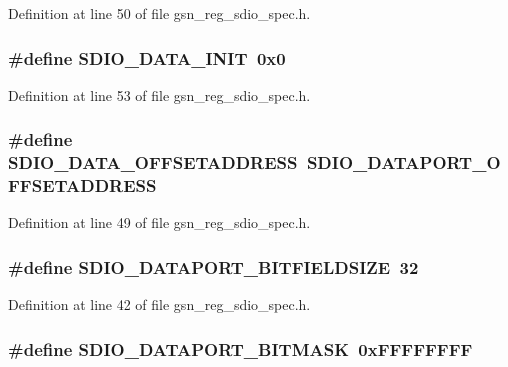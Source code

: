 Definition at line 50 of file gsn\_\-reg\_\-sdio\_\-spec.h.

\hypertarget{a00571_a398fe045c17dac59478629be7e393ac5}{
\subsubsection[{SDIO\_\-DATA\_\-INIT}]{\setlength{\rightskip}{0pt plus 5cm}\#define SDIO\_\-DATA\_\-INIT~0x0}}
\label{a00571_a398fe045c17dac59478629be7e393ac5}


Definition at line 53 of file gsn\_\-reg\_\-sdio\_\-spec.h.

\hypertarget{a00571_a40a21fed57b5ab66c124fb3dc0792aea}{
\subsubsection[{SDIO\_\-DATA\_\-OFFSETADDRESS}]{\setlength{\rightskip}{0pt plus 5cm}\#define SDIO\_\-DATA\_\-OFFSETADDRESS~SDIO\_\-DATAPORT\_\-OFFSETADDRESS}}
\label{a00571_a40a21fed57b5ab66c124fb3dc0792aea}


Definition at line 49 of file gsn\_\-reg\_\-sdio\_\-spec.h.

\hypertarget{a00571_a24b5d10f11df4079f02e98bb772166c5}{
\subsubsection[{SDIO\_\-DATAPORT\_\-BITFIELDSIZE}]{\setlength{\rightskip}{0pt plus 5cm}\#define SDIO\_\-DATAPORT\_\-BITFIELDSIZE~32}}
\label{a00571_a24b5d10f11df4079f02e98bb772166c5}


Definition at line 42 of file gsn\_\-reg\_\-sdio\_\-spec.h.

\hypertarget{a00571_a461df4f4c6cf282d2ae7e4b4dd623ed3}{
\subsubsection[{SDIO\_\-DATAPORT\_\-BITMASK}]{\setlength{\rightskip}{0pt plus 5cm}\#define SDIO\_\-DATAPORT\_\-BITMASK~0xFFFFFFFF}}
\label{a00571_a461df4f4c6cf282d2ae7e4b4dd623ed3}



